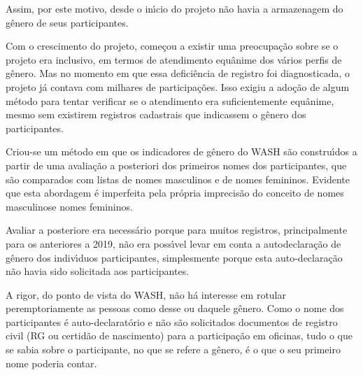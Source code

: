 \documentclass[
12pt,		%
openright,	%
twoside,  %
a4paper,			%
chapter=TITLE,		%
english,			%
french,				%
spanish,			%
brazil				%
]{USPSC-classe/USPSC_RedarTex}
\begin{document}
Assim, por este motivo, desde o in\'{\i}cio do projeto n\~ao havia a armazenagem do g\^enero de seus participantes.








Com o crescimento do projeto, come\c{c}ou a existir uma preocupa\c{c}\~ao sobre se o projeto era inclusivo, em termos de atendimento equ\^anime dos v\'arios perfis de g\^enero. Mas no momento em que essa defici\^encia de registro foi diagnosticada, o projeto j\'a contava com milhares de participa\c{c}\~oes. Isso exigiu a ado\c{c}\~ao de algum m\'etodo para tentar verificar se o atendimento era suficientemente equ\^anime, mesmo sem existirem registros cadastrais que indicassem o g\^enero dos participantes.








Criou-se um m\'etodo em que os indicadores de g\^enero do WASH s\~ao constru\'{\i}dos a partir de uma avalia\c{c}\~ao a posteriori dos primeiros nomes dos participantes, que s\~ao comparados com listas de nomes masculinos e de nomes femininos. Evidente que esta abordagem \'e imperfeita pela pr\'opria imprecis\~ao do conceito de \textquotedbl nomes masculinos\textquotedbl  e \textquotedbl nomes femininos\textquotedbl .








Avaliar a posteriore era necess\'ario porque para muitos registros, principalmente para os anteriores a 2019, n\~ao era poss\'{\i}vel levar em conta a autodeclara\c{c}\~ao de g\^enero dos indiv\'{\i}duos participantes, simplesmente porque esta auto-declara\c{c}\~ao n\~ao havia sido solicitada aos participantes.








A rigor, do ponto de vista do WASH, n\~ao h\'a interesse em rotular peremptoriamente as pessoas como desse ou daquele g\^enero. Como o nome dos participantes \'e auto-declarat\'orio e n\~ao s\~ao solicitados documentos de registro civil (RG ou certid\~ao de nascimento) para a participa\c{c}\~ao em oficinas, tudo o que se sabia sobre o participante, no que se refere a g\^enero, \'e o que o seu primeiro nome poderia contar.
\end{document}
